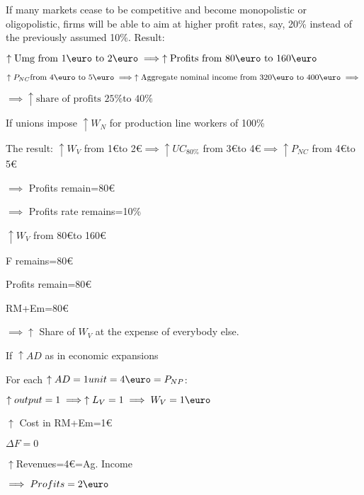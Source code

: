 \documentclass{report}
\begin{document}
\begin{enumerate}
    \item If many markets cease to be competitive and become monopolistic or oligopolistic, firms will be able to aim at higher profit rates, say, 20\% instead of the previously assumed 10\%. Result:
    \begin{description}
       \item $\uparrow \text{Umg from 1\euro to 2\euro} \implies \uparrow \text{Profits from 80\euro to 160\euro}$
       \item $\uparrow P_{NC} \text{from 4\euro to 5\euro} \implies \uparrow\text{Aggregate nominal income from 320\euro to 400\euro}\implies $
       \item $\implies \uparrow \text{share of profits 25\% to 40\%}$
    \end{description}
    \item If unions impose $\uparrow W_N$ for production line workers of 100\%
    \begin{description}
        \item The result: $\uparrow W_V$ from 1\euro to 2\euro $\implies \uparrow UC_{80\%}$ from 3\euro to 4\euro $\implies \uparrow P_{NC}$ from 4\euro to 5\euro 
            \begin{description}
                \item $\implies$ Profits remain=80\euro
                \item $\implies$ Profits rate remains=10\%
            \end{description}
        \item $\uparrow W_V$ from 80\euro to 160\euro
        \item F remains=80\euro 
        \item Profits remain=80\euro
        \item RM+Em=80\euro
        \item $\implies \uparrow$ Share of $W_V$ at the expense of everybody else.
    \end{description}
    \item If $\uparrow AD$ as in economic expansions 
        \begin{description}
            \item For each $\uparrow AD=1unit=4\text{\euro}=P_{NP}$:
            \begin{description}
                \item $\uparrow output=1 \implies \uparrow L_V=1 \implies W_V=1\text{\euro}$
                \item $\uparrow$ Cost in RM+Em=1\euro
                \item $\Delta F=0$
                \item $\uparrow$Revenues=4\euro=Ag. Income
            \end{description}
            \item $\implies Profits=2\text{\euro}$
        \end{description}
\end{enumerate}
\end{document}
